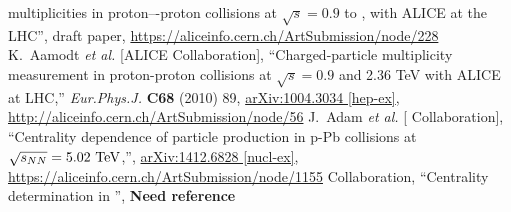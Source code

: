 \begin{thebibliography}{99}
  multiplicities in proton–-proton collisions at $\sqrt{s} = 0.9$ to
  \TeV[8]{}, with ALICE at the LHC'', draft paper,
  \url{https://aliceinfo.cern.ch/ArtSubmission/node/228}
  K.~Aamodt {\it et al.}  [ALICE Collaboration],
  ``Charged-particle multiplicity measurement in proton-proton collisions at $\sqrt{s}=0.9$ and 2.36 TeV with ALICE at LHC,''
  \textit{Eur.Phys.J.} \textbf{C68} (2010) 89, 
  \href{http://arxiv.org/abs/1004.3034}{arXiv:1004.3034 [hep-ex]},
  \url{http://aliceinfo.cern.ch/ArtSubmission/node/56} 
  J.~Adam {\it et al.}  [\ALICE{} Collaboration],
  ``Centrality dependence of particle production in p-Pb collisions at
  $\usNN{pPb}{5023}$,'',
  \href{http://arxiv.org/abs/1412.6828}{arXiv:1412.6828 [nucl-ex]}, 
  \url{https://aliceinfo.cern.ch/ArtSubmission/node/1155}
  \ALICE{} Collaboration, ``Centrality determination in \PbPbCol{}'',
  \textbf{{\color{alicered} Need reference}}
\end{thebibliography}
